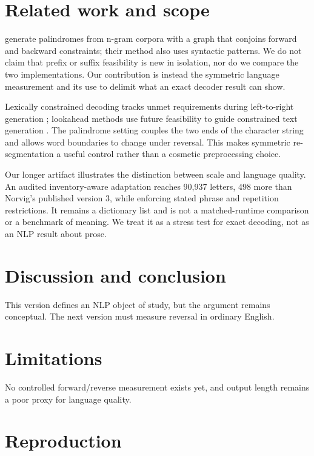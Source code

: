 \documentclass[11pt]{article}
\begin{document}
\section{Related work and scope}

\citet{papadopoulos2015palindromes} generate palindromes from n-gram corpora
with a graph that conjoins forward and backward constraints; their method also
uses syntactic patterns. We do not claim that prefix or suffix feasibility is
new in isolation, nor do we compare the two implementations. Our contribution
is instead the symmetric language measurement and its use to delimit what an
exact decoder result can show.

Lexically constrained decoding tracks unmet requirements during left-to-right
generation \citep{hokamp2017grid,post2018fast}; lookahead methods use future
feasibility to guide constrained text generation \citep{lu2022astar}. The
palindrome setting couples the two ends of the character string and allows word
boundaries to change under reversal. This makes symmetric re-segmentation a
useful control rather than a cosmetic preprocessing choice.

Our longer artifact illustrates the distinction between scale and language
quality. An audited inventory-aware adaptation reaches 90,937 letters, 498
more than Norvig's published version 3, while enforcing stated phrase and
repetition restrictions. It remains a dictionary list and is not a
matched-runtime comparison or a benchmark of meaning. We treat it as a stress
test for exact decoding, not as an NLP result about prose.

\section{Discussion and conclusion}

This version defines an NLP object of study, but the argument remains conceptual. The next version must measure reversal in ordinary English.

\section*{Limitations}

No controlled forward/reverse measurement exists yet, and output length remains a poor proxy for language quality.



\appendix
\section{Reproduction}
\end{document}
